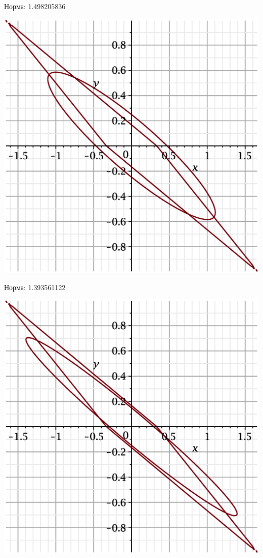 \documentclass{beamer}
\begin{document}
\begin{frame}
Норма: 1.498205836
    \begin{center}
        \includegraphics[scale=0.4]{pictures/4.eps}
    \end{center}
\end{frame}

\begin{frame}
Норма: 1.393561122
    \begin{center}
        \includegraphics[scale=0.4]{pictures/5.eps}
    \end{center}
\end{frame}
\end{document}
